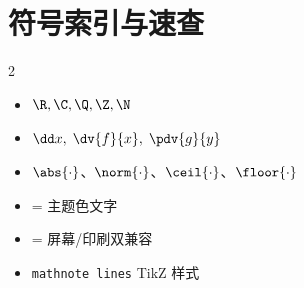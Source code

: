 \documentclass[a4paper,11pt]{ctexart}
\begin{document}
\clearpage
\section{符号索引与速查}

\begin{multicols}{2}
\begin{itemize}
    \item $\R, \C, \Q, \Z, \N$
    \item $\dd x,\; \dv{f}{x},\; \pdv{g}{y}$
    \item $\abs{\cdot}$、$\norm{\cdot}$、$\ceil{\cdot}$、$\floor{\cdot}$
    \item {} = 主题色文字
    \item {} = 屏幕/印刷双兼容
    \item \texttt{mathnote lines} TikZ 样式
\end{itemize}
\end{multicols}
\end{document}
